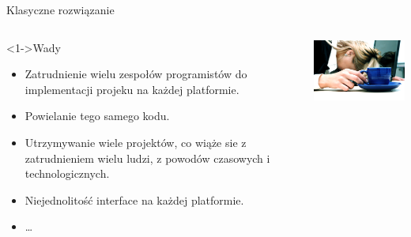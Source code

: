 \documentclass{beamer}
\begin{document}
\begin{frame}{Klasyczne rozwiązanie}
     \begin{columns}[T] %
      
     \begin{column}[T]{6cm} %
     \begin{block}<1->{Wady}
			\begin{itemize}
    \item<1-> Zatrudnienie wielu zespołów programistów do implementacji projeku na każdej 
    platformie.
    \item<2-> Powielanie tego samego kodu.
    \item<3-> Utrzymywanie wiele projektów, co wiąże sie z zatrudnieniem wielu
    ludzi, z powodów czasowych i technologicznych.
    \item<4-> Niejednolitość interface na każdej platformie.
    \item<5-> \dots
    \end{itemize}
	\end{block}
     \end{column}
     \begin{column}[Tc]{6cm} %
          \includegraphics[width=6cm]{busy.jpg}
     \end{column}
     \end{columns}
\end{frame}
\end{document}
